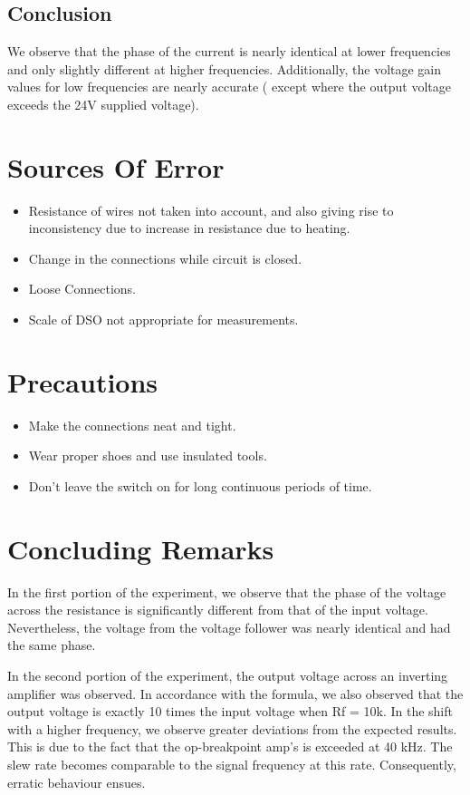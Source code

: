 \documentclass{article}
\begin{document}
\subsection{Conclusion}
We observe that the phase of the current is nearly identical at lower frequencies and only slightly different at higher frequencies. Additionally, the voltage gain values for low frequencies are nearly accurate ( except where the output voltage exceeds the 24V supplied voltage).
\newpage
\section{Sources Of Error}
\begin{itemize}
    \item Resistance of wires not taken into account, and also giving rise to inconsistency due to increase in resistance due to heating.
    \item Change in the connections while circuit is closed.
    \item Loose Connections.
    \item Scale of DSO not appropriate for measurements.
\end{itemize}
\section{Precautions}
\begin{itemize}
    \item Make the connections neat and tight.
    \item Wear proper shoes and use insulated tools.
    \item Don’t leave the switch on for long continuous periods of time.
\end{itemize}
\section{Concluding Remarks}
In the first portion of the experiment, we observe that the phase of the voltage across the resistance is significantly different from that of the input voltage. Nevertheless, the voltage from the voltage follower was nearly identical and had the same phase.\par

In the second portion of the experiment, the output voltage across an inverting amplifier was observed. In accordance with the formula, we also observed that the output voltage is exactly 10 times the input voltage when Rf = 10k. In the shift with a higher frequency, we observe greater deviations from the expected results. This is due to the fact that the op-breakpoint amp's is exceeded at 40 kHz. The slew rate becomes comparable to the signal frequency at this rate. Consequently, erratic behaviour ensues.\par
\end{document}

